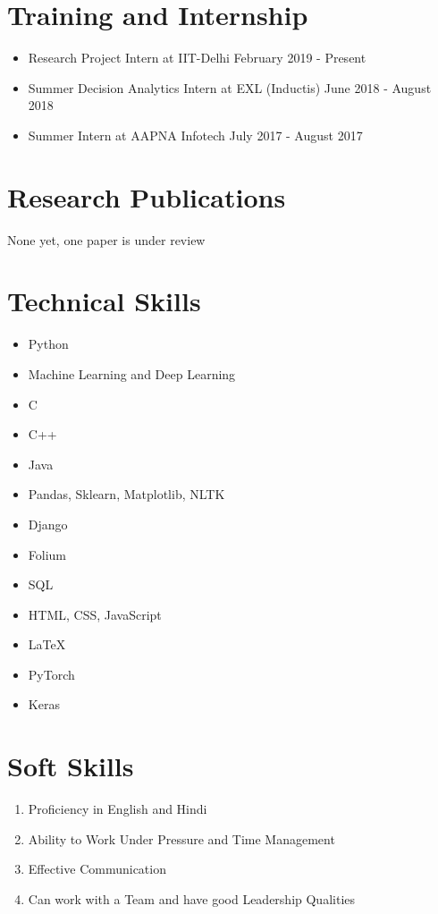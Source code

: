 \documentclass{article}
\begin{document}
\section{Training and Internship}
\begin{itemize}
\item Research Project Intern at IIT-Delhi February 2019 - Present
\item Summer Decision Analytics Intern at EXL (Inductis) June 2018 - August 2018
\item Summer Intern at AAPNA Infotech July 2017 - August 2017
\end{itemize}

\section{Research Publications}
None yet, one paper is under review

\section{Technical Skills}
\begin{itemize}
\item Python
\item  Machine Learning and Deep Learning
\item C
\item C++
\item Java
\item  Pandas, Sklearn, Matplotlib, NLTK
\item  Django
\item  Folium
\item SQL
\item HTML, CSS, JavaScript
\item \LaTeX
\item PyTorch
\item Keras
\end{itemize}

\section{Soft Skills}

\begin{enumerate}
\item Proficiency in English and Hindi 
\item Ability to Work Under Pressure and Time Management
\item Effective Communication 
\item Can work with a Team and have good Leadership Qualities 
\end{enumerate}
\end{document}
